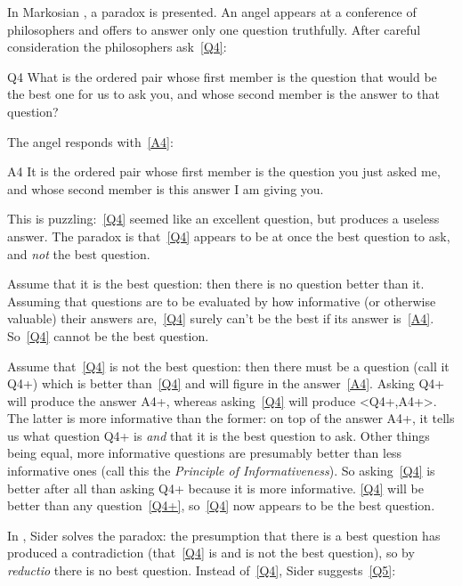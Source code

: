 In Markosian \parencite[]{Markosian_1997}, a paradox is presented.
An angel appears at a conference of philosophers and offers to answer only one question truthfully.
After careful consideration the philosophers ask~\ref{Q4}\footnotemark:

	\begin{principle}{Q4}\label{Q4}
	What is the ordered pair whose first member is the question that would be the best one for us to ask you, and whose second member is the answer to that question? 
	\end{principle}

The angel responds with~\ref{A4}:

	\begin{principle}{A4}\label{A4}
	It is the ordered pair whose first member is the question you just asked me, and whose second member is this answer I am giving you. 
	\end{principle}

This is puzzling:~\ref{Q4} seemed like an excellent question, but produces a useless answer.
The paradox is that~\ref{Q4} appears to be at once the best question to ask, and \emph{not} the best question.

Assume that it is the best question: then there is no question better than it.
Assuming that questions are to be evaluated by how informative (or otherwise valuable) their answers are,~\ref{Q4} surely can't be the best if its answer is~\ref{A4}.
So~\ref{Q4} cannot be the best question.

Assume that~\ref{Q4} is not the best question: then there must be a question (call it Q4+) which is better than~\ref{Q4} and will figure in the answer~\ref{A4}.
Asking Q4+ will produce the answer A4+, whereas asking~\ref{Q4} will produce <Q4+,A4+>.
The latter is more informative than the former: on top of the answer A4+, it tells us what question Q4+ is \emph{and} that it is the best question to ask.
Other things being equal, more informative questions are presumably better than less informative ones (call this the \textit{Principle of Informativeness}).
So asking~\ref{Q4} is better after all than asking Q4+ because it is more informative.
\ref{Q4} will be better than any question~\ref{Q4+}, so~\ref{Q4} now appears to be the best question.

In \parencite[]{Sider1997}, Sider solves the paradox: the presumption that there is a best question has produced a contradiction (that~\ref{Q4} is and is not the best question), so by \textit{reductio} there is no best question.
Instead of~\ref{Q4}, Sider suggests~\ref{Q5}:

